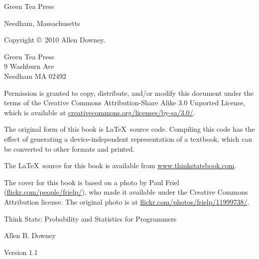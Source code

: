 \documentclass[12pt]{book}
\newcommand{\thetitle}{Think Stats: Probability and Statistics for Programmers}
\newcommand{\theversion}{1.1}
\begin{document}
\begin{latexonly}
\begin{flushright}
\vspace{0.5in}

{\Large Green Tea Press}

{\small Needham, Massachusetts}

\vfill

\end{flushright}


\pagebreak
\thispagestyle{empty}

{\small
Copyright \copyright ~2010 Allen Downey.


\vspace{0.2in}

\begin{flushleft}
Green Tea Press       \\
9 Washburn Ave \\
Needham MA 02492
\end{flushleft}

Permission is granted to copy, distribute, and/or modify this document
under the terms of the Creative Commons Attribution-Share Alike 3.0 Unported
License, which is available at \url{creativecommons.org/licenses/by-sa/3.0/}.

The original form of this book is \LaTeX\ source code.  Compiling this
code has the effect of generating a device-independent representation
of a textbook, which can be converted to other formats and printed.

The \LaTeX\ source for this book is available from
\url{www.thinkstatsbook.com}.

The cover for this book is based on a photo by Paul Friel
(\url{flickr.com/people/frielp/}), who made it available under
the Creative Commons Attribution license.  The original photo
is at \url{flickr.com/photos/frielp/11999738/}.

\vspace{0.2in}

} %

\end{latexonly}



\begin{htmlonly}


{\Large \thetitle}

{\large Allen B. Downey}

Version \theversion

\setcounter{chapter}{-1}

\end{htmlonly}
\end{document}
